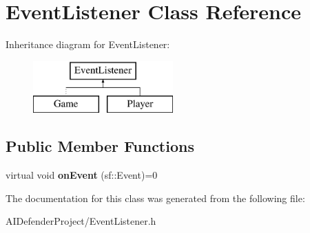 \hypertarget{class_event_listener}{}\section{Event\+Listener Class Reference}
\label{class_event_listener}
Inheritance diagram for Event\+Listener\+:\begin{figure}[H]
\begin{center}
\leavevmode
\includegraphics[height=2.000000cm]{class_event_listener}
\end{center}
\end{figure}
\subsection*{Public Member Functions}
\begin{DoxyCompactItemize}
\item 
\mbox{\label{class_event_listener_a9c9605986d289a8ad888540a21339cf4}} 
virtual void {\bfseries on\+Event} (sf\+::\+Event)=0
\end{DoxyCompactItemize}


The documentation for this class was generated from the following file\+:\begin{DoxyCompactItemize}
\item 
A\+I\+Defender\+Project/Event\+Listener.\+h\end{DoxyCompactItemize}

